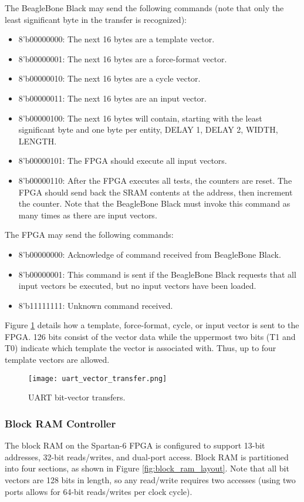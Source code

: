 The BeagleBone Black may send the following commands (note that only the least significant byte in the transfer is recognized): 
\begin{itemize}
\item 8'b00000000: The next 16 bytes are a template vector.
\item 8'b00000001: The next 16 bytes are a force-format vector.
\item 8'b00000010: The next 16 bytes are a cycle vector.
\item 8'b00000011: The next 16 bytes are an input vector.
\item 8'b00000100: The next 16 bytes will contain, starting with the least significant byte and one byte per entity, DELAY 1, DELAY 2, WIDTH, LENGTH.
\item 8'b00000101: The FPGA should execute all input vectors.
\item 8'b00000110: After the FPGA executes all tests, the counters are reset. The FPGA should send back the SRAM contents at the address, then increment the counter. Note that the BeagleBone Black must invoke this command as many times as there are input vectors.
\end{itemize}

The FPGA may send the following commands: 
\begin{itemize}
\item 8'b00000000: Acknowledge of command received from BeagleBone Black.
\item 8'b00000001: This command is sent if the BeagleBone Black requests that all input vectors be executed, but no input vectors have been loaded.
\item 8'b11111111: Unknown command received.
\end{itemize}

Figure \ref{fig:uart_vector_transfer} details  how a template, force-format, cycle, or input vector is sent to the FPGA. 126 bits consist of the vector data while the uppermost two bits (T1 and T0) indicate which template the vector is associated with. Thus, up to four template vectors are allowed.

\begin{figure}
\texttt{[image: uart\_vector\_transfer.png]}
\caption{UART bit-vector transfers.}
\label{fig:uart_vector_transfer}
\end{figure}

\subsubsection{Block RAM Controller}
The block RAM on the Spartan-6 FPGA is configured to support 13-bit addresses, 32-bit reads/writes, and dual-port access. Block RAM is partitioned into four sections, as shown in Figure \ref{fig:block_ram_layout}. Note that all bit vectors are 128 bits in length, so any read/write requires two accesses (using two ports allows for 64-bit reads/writes per clock cycle).

